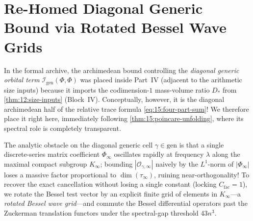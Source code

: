 \section{Re-Homed Diagonal Generic Bound via Rotated Bessel Wave Grids}
\label{sec:15:diag-wave-grid}

In the formal archive, the archimedean bound controlling the \emph{diagonal generic orbital term} $\mathcal{I}_{\mathrm{gen}}(\Phi, \Phi)$ was placed inside Part~IV (adjacent to the arithmetic size inputs) because it imports the codimension-$1$ mass-volume ratio $D_*$ from \cref{thm:12:size-inputs} (Block~IV). Conceptually, however, it is the diagonal archimedean half of the relative trace formula \eqref{eq:15:four-part-sum}! We therefore place it right here, immediately following \cref{thm:15:poincare-unfolding}, where its spectral role is completely transparent.


The analytic obstacle on the diagonal generic cell $\gamma \in \mathrm{gen}$ is that a single discrete-series matrix coefficient $\Phi_\infty$ oscillates rapidly at frequency $\lambda$ along the maximal compact subgroup $K_\infty$; bounding $|\mathcal{O}_{\gamma, \infty}|$ naively by the $L^1$-norm of $|\Phi_\infty|$ loses a massive factor proportional to $\dim(\tau_\infty)$, ruining near-orthogonality! To recover the exact cancellation without losing a single constant (locking $C_{\mathrm{fac}} = 1$), we rotate the Bessel test vector by an explicit finite grid of elements in $K_\infty$—a \emph{rotated Bessel wave grid}—and commute the Bessel differential operators past the Zuckerman translation functors under the spectral-gap threshold $43 n^3$.

